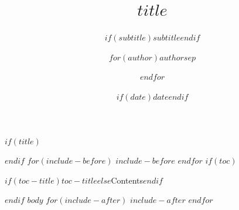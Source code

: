 \documentclass[$if(fontsize)$$fontsize$$else$11pt$endif$,hyperref={pdfpagelabels=false},aspectratio=$if(aspectratio)$$aspectratio$$else$169$endif$$if(handout)$,handout$endif$$for(classoption)$,$classoption$$endfor$]{beamer}
\title[$if(shorttitle)$$shorttitle$$else$$title$$endif$]{$title$}
\subtitle{$if(subtitle)$$subtitle$$endif$}
\author{$for(author)$$author$$sep$ \and $endfor$}
\institute{$for(institute)$$institute$$sep$ \and $endfor$}
\date{$if(date)$$date$$endif$}
\begin{document}
$if(title)$
\begin{frame}[plain]
  \titlepage
\end{frame}
$endif$
$for(include-before)$
$include-before$
$endfor$
$if(toc)$
\begin{frame}{$if(toc-title)$$toc-title$$else$Contents$endif$}
  \tableofcontents
\end{frame}
$endif$
$body$
$for(include-after)$
$include-after$
$endfor$
\end{document}
